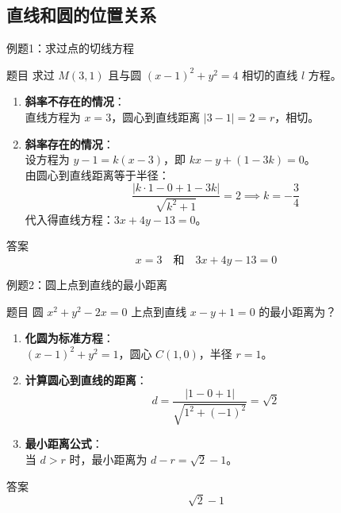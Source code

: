 \subsection{直线和圆的位置关系}
\begin{frame}{例题1：求过点的切线方程}
    \begin{block}{题目}
        求过 \( M(3,1) \) 且与圆 \( (x-1)^2 + y^2 = 4 \) 相切的直线 \( l \) 方程。
    \end{block}
    \pause
    \begin{enumerate}
        \item \textbf{斜率不存在的情况}：\\
            直线方程为 \( x = 3 \)，圆心到直线距离 \( |3-1| = 2 = r \)，相切。

        \item \textbf{斜率存在的情况}：\\
            设方程为 \( y-1 = k(x-3) \)，即 \( kx - y + (1-3k) = 0 \)。\\
            由圆心到直线距离等于半径：
            \[
            \frac{|k \cdot 1 - 0 + 1 - 3k|}{\sqrt{k^2 + 1}} = 2 \implies k = -\frac{3}{4}
            \]
            代入得直线方程：\( 3x + 4y - 13 = 0 \)。
    \end{enumerate}

    \begin{block}{答案}
        \[
        \boxed{x=3} \quad \text{和} \quad \boxed{3x +4y -13 =0}
        \]
    \end{block}
\end{frame}





\begin{frame}{例题2：圆上点到直线的最小距离}
  \begin{block}{题目}
      圆 \( x^2 + y^2 -2x = 0 \) 上点到直线 \( x - y +1 = 0 \) 的最小距离为？
  \end{block}
  \pause
  \begin{enumerate}
      \item \textbf{化圆为标准方程}：\\
          \( (x-1)^2 + y^2 = 1 \)，圆心 \( C(1,0) \)，半径 \( r=1 \)。

      \item \textbf{计算圆心到直线的距离}：\\
          \[
          d = \frac{|1 - 0 + 1|}{\sqrt{1^2 + (-1)^2}} = \sqrt{2}
          \]

      \item \textbf{最小距离公式}：\\
          当 \( d > r \) 时，最小距离为 \( d - r = \sqrt{2} - 1 \)。
  \end{enumerate}


  \begin{block}{答案}
      \[
      \boxed{\sqrt{2} -1}
      \]
  \end{block}
\end{frame}

